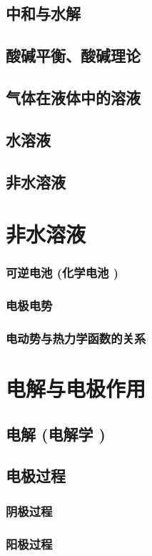 \documentclass[UTF8]{../03-Chemistry}
\begin{document}
    \subsection{中和与水解}
    \subsection{酸碱平衡、酸碱理论}
    \subsection{气体在液体中的溶液}
    \subsection{水溶液}
    \subsection{非水溶液}
\section{非水溶液}
    \subsubsection{可逆电池 (化学电池 )}
    \subsubsection{电极电势}
    \subsubsection{电动势与热力学函数的关系}
\section{电解与电极作用}
    \subsection{电解 (电解学 )}
    \subsection{电极过程}
        \subsubsection{阴极过程}
        \subsubsection{阳极过程}
\end{document}
